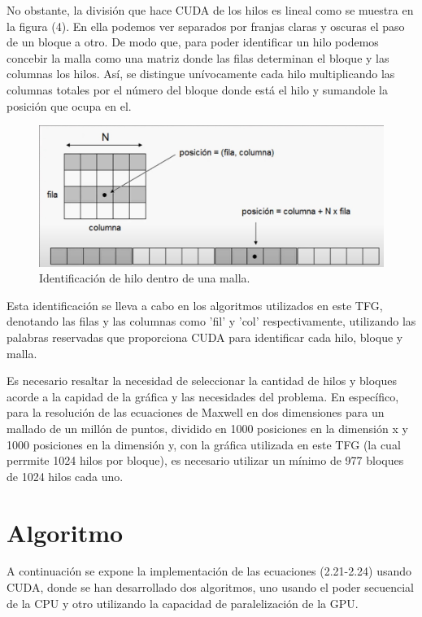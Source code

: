 \documentclass[11pt,a4paper,twoside,pdf]{article}
\numberwithin{equation}{section}
\begin{document}
No obstante, la división que hace CUDA de los hilos es lineal como se muestra en la figura (4). En ella podemos ver separados por franjas claras y oscuras el paso de un bloque a otro. De modo que, para poder identificar un hilo podemos concebir la malla como una matriz donde las filas determinan el bloque y las columnas los hilos. Así, se distingue unívocamente cada hilo multiplicando las columnas totales por el número del bloque donde está el hilo y sumandole la posición que ocupa en el.

\begin{figure}[h]
\centering
\includegraphics[width=10 cm]{Nvidia_Posicion_hilo.jpg}				
\caption{Identificación de hilo dentro de una malla.}
\end{figure}
\noindent

Esta identificación se lleva a cabo en los algoritmos utilizados en este TFG, denotando las filas y las columnas como 'fil' y 'col' respectivamente, utilizando las palabras reservadas que proporciona CUDA para identificar cada hilo, bloque y malla.

Es necesario resaltar la necesidad de seleccionar la cantidad de hilos y bloques acorde a la capidad de la gráfica y las necesidades del problema. En específico, para la resolución de las ecuaciones de Maxwell en dos dimensiones para un mallado de un millón de puntos, dividido en 1000 posiciones en la dimensión x y 1000 posiciones en la dimensión y, con la gráfica utilizada en este TFG (la cual perrmite 1024 hilos por bloque), es necesario utilizar un mínimo de 977 bloques de 1024 hilos cada uno.

\newpage

\section{Algoritmo}

A continuación se expone la implementación de las ecuaciones (2.21-2.24) usando CUDA, donde se han desarrollado dos algoritmos, uno usando el poder secuencial de la CPU y otro utilizando la capacidad de paralelización de la GPU. 
\end{document}
